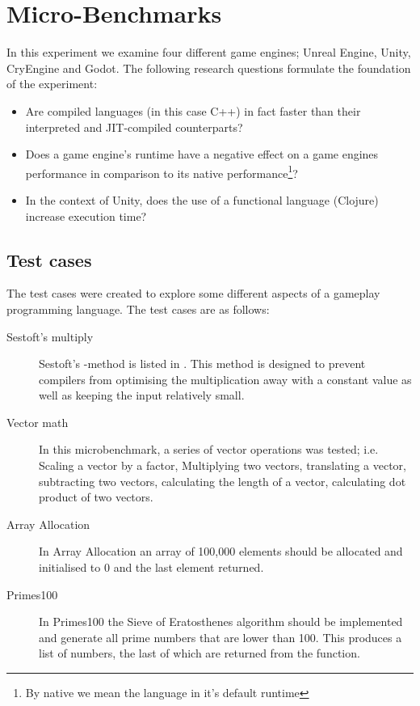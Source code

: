 \section{Micro-Benchmarks}
In this experiment we examine four different game engines; Unreal Engine, Unity, CryEngine and Godot. The following research questions formulate the foundation of the experiment:
\begin{itemize}
    \item Are compiled languages (in this case C++) in fact faster than their interpreted and \ac{JIT}-compiled counterparts?
    \item Does a game engine's runtime have a negative effect on a game engines performance in comparison to its native performance\footnote{By native we mean the language in it's default runtime}?
    \item In the context of Unity, does the use of a functional language (Clojure) increase execution time?
\end{itemize}

\subsection{Test cases}
The test cases were created to explore some different aspects of a gameplay programming language. The test cases are as follows: 
\begin{description} 
    \item[Sestoft's multiply] Sestoft's -method is listed in . This method is designed to prevent compilers from optimising the multiplication away with a constant value as well as keeping the input relatively small.
    \item[Vector math] In this microbenchmark, a series of vector operations was tested; i.e. Scaling a vector by a factor, Multiplying two vectors, translating a vector, subtracting two vectors, calculating the length of a vector, calculating dot product of two vectors.
    \item[Array Allocation] In Array Allocation an array of 100,000 elements should be allocated and initialised to 0 and the last element returned.
    \item[Primes100] In Primes100 the Sieve of Eratosthenes algorithm\cite{eratosthenes:sieve} should be implemented and generate all prime numbers that are lower than 100. This produces a list of numbers, the last of which are returned from the function. 
\end{description}


